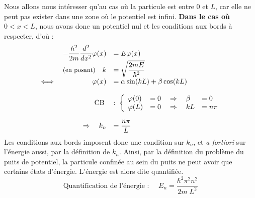 \documentclass{book}
\begin{document}
Nous allons nous intéresser qu'au cas où la particule est entre $0$ et $L$, car elle ne peut pas exister dans une zone où le potentiel est infini. \textbf{Dans le cas où} $0<x<L$, nous avons donc un potentiel nul et les conditions aux bords à respecter, d'où :
\begin{equation}
\begin{array}{lrl}
& -\dfrac{\hbar ^2}{2m} \dfrac{ d ^2}{d x^2 } \varphi(x) &= E \varphi (x) \\
&\text{\small (en posant)} \quad k &= \sqrt{\dfrac{2mE}{\hbar ^2}} \\
\iff & \varphi(x) &= \alpha \sin(kL) + \beta\cos(kL) \\ \strut \\
&\text{CB} \;  &:  \; \left\{ \begin{array}{lll}
\varphi(0) &= 0 \quad \Rightarrow \quad \beta &= 0 \\
\varphi(L) &= 0 \quad \Rightarrow \quad kL &= n\pi \\
\end{array}\right. \\ \strut \\
&\Rightarrow \quad k_n &= \dfrac{n\pi}{L}
\end{array}
\end{equation}
Les conditions aux bords imposent donc une condition sur $k_n$, et \textit{a fortiori} sur l'énergie aussi, par la définition de $k_n$. Ainsi, par la définition du problème du puits de potentiel, la particule confinée au sein du puits ne peut avoir que certains états d'énergie. L'énergie est alors dite quantifiée.
\begin{equation}\label{eq:quantification_energie}
\boxed{\text{Quantification de l'énergie : } \quad E_n = \dfrac{\hbar ^2 \pi ^2 n ^2}{2m \; L^2}}
\end{equation}
\end{document}
